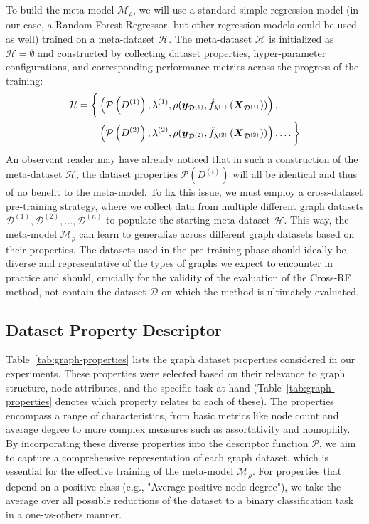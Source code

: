 To build the meta-model \( \mathcal{M}_\rho \), we will use a standard simple regression model (in our case, a Random Forest Regressor, but other regression models could be used as well) trained on a meta-dataset \( \mathcal{H} \).
The meta-dataset \( \mathcal{H} \) is initialized as \( \mathcal{H} = \emptyset \) and constructed by collecting dataset properties, hyper-parameter configurations, and corresponding performance metrics across the progress of the training:
\begin{equation*}
	\begin{split}
		\mathcal{H} = \biggl\{ &\left( \mathcal{P} \left( D^{(1)} \right), \lambda^{(1)}, \rho( \boldsymbol{y}_{\mathcal{D}^{(1)}}, \hat{f}_{\lambda^{(1)}} \left( \boldsymbol{X}_{\mathcal{D}^{(1)}} \right) ) \right), \\
		&\left( \mathcal{P} \left( D^{(2)} \right), \lambda^{(2)}, \rho( \boldsymbol{y}_{\mathcal{D}^{(2)}}, \hat{f}_{\lambda^{(2)}} \left( \boldsymbol{X}_{\mathcal{D}^{(2)}} \right) ) \right), \dots \biggr\}
	\end{split}
\end{equation*}
An observant reader may have already noticed that in such a construction of the meta-dataset \( \mathcal{H} \), the dataset properties \( \mathcal{P} \left( D^{(i)} \right) \) will all be identical and thus of no benefit to the meta-model. To fix this issue, we must employ a cross-dataset pre-training strategy, where we collect data from multiple different graph datasets \( \mathcal{D}^{(1)}, \mathcal{D}^{(2)}, \dots, \mathcal{D}^{(n)} \) to populate the starting meta-dataset \( \mathcal{H} \). This way, the meta-model \( \mathcal{M}_\rho \) can learn to generalize across different graph datasets based on their properties. The datasets used in the pre-training phase should ideally be diverse and representative of the types of graphs we expect to encounter in practice and should, crucially for the validity of the evaluation of the Cross-RF method, not contain the dataset \( \mathcal{D} \) on which the method is ultimately evaluated.

\subsection{Dataset Property Descriptor}

Table~\ref{tab:graph-properties} lists the graph dataset properties considered in our experiments. These properties were selected based on their relevance to graph structure, node attributes, and the specific task at hand (Table~\ref{tab:graph-properties} denotes which property relates to each of these). The properties encompass a range of characteristics, from basic metrics like node count and average degree to more complex measures such as assortativity and homophily. By incorporating these diverse properties into the descriptor function \( \mathcal{P} \), we aim to capture a comprehensive representation of each graph dataset, which is essential for the effective training of the meta-model \( \mathcal{M}_\rho \). For properties that depend on a positive class (e.g., "Average positive node degree"), we take the average over all possible reductions of the dataset to a binary classification task in a one-vs-others manner.

